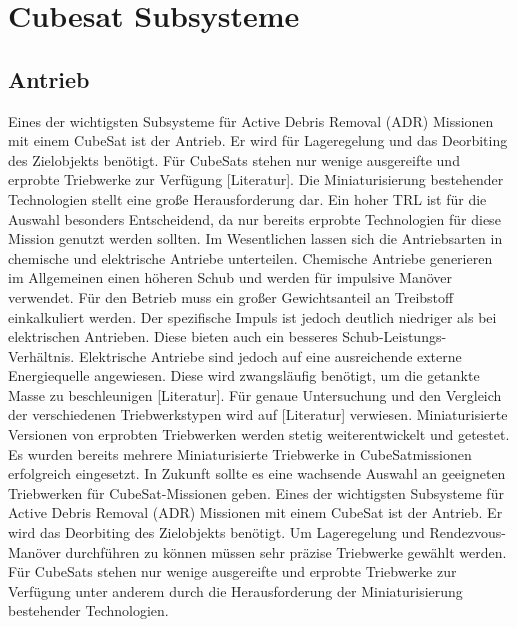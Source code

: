 	\section{Cubesat Subsysteme}%
		\subsection{Antrieb}%
Eines der wichtigsten Subsysteme für Active Debris Removal (ADR) Missionen mit einem CubeSat ist der Antrieb. Er wird für Lageregelung und das Deorbiting des Zielobjekts benötigt.
Für CubeSats stehen nur wenige ausgereifte und erprobte Triebwerke zur Verfügung [Literatur].  Die Miniaturisierung bestehender Technologien stellt eine große Herausforderung dar. Ein hoher TRL ist für die Auswahl besonders Entscheidend, da nur bereits erprobte Technologien für diese Mission genutzt werden sollten.
Im Wesentlichen lassen sich die Antriebsarten in chemische und elektrische Antriebe unterteilen.  Chemische Antriebe generieren im Allgemeinen einen höheren Schub und werden für impulsive Manöver verwendet. Für den Betrieb muss ein großer Gewichtsanteil an Treibstoff einkalkuliert werden. Der spezifische Impuls ist jedoch deutlich niedriger als bei elektrischen Antrieben. Diese bieten auch ein besseres Schub-Leistungs-Verhältnis. Elektrische Antriebe sind jedoch auf eine ausreichende externe Energiequelle angewiesen. Diese wird zwangsläufig benötigt, um die getankte Masse zu beschleunigen [Literatur].
Für genaue Untersuchung und den Vergleich der verschiedenen Triebwerkstypen wird auf [Literatur] verwiesen. Miniaturisierte Versionen von erprobten Triebwerken werden stetig weiterentwickelt und getestet. Es wurden bereits mehrere Miniaturisierte Triebwerke in CubeSatmissionen erfolgreich eingesetzt. In Zukunft sollte es eine wachsende Auswahl an geeigneten Triebwerken für CubeSat-Missionen geben. 
Eines der wichtigsten Subsysteme für Active Debris Removal (ADR) Missionen mit einem CubeSat ist der Antrieb. Er wird das Deorbiting des Zielobjekts benötigt.  Um Lageregelung und Rendezvous-Manöver durchführen zu können müssen sehr präzise Triebwerke gewählt werden. Für CubeSats stehen nur wenige ausgereifte und erprobte Triebwerke zur Verfügung unter anderem durch die Herausforderung der Miniaturisierung bestehender Technologien.  
